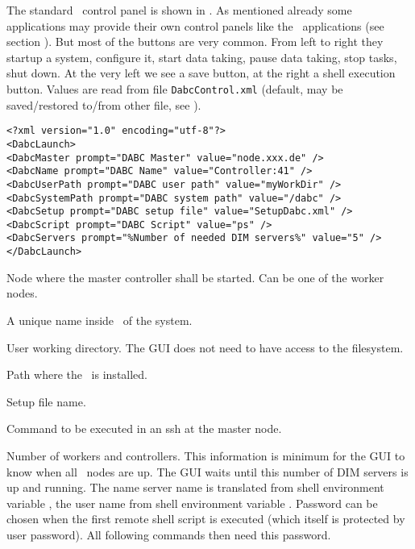 The standard \dabc\ control panel is shown in .
As mentioned already some applications may provide their own control panels
like the \mbs\ applications (see section ).
But most of the buttons are very common.
From left to right they startup a system, configure it, start
data taking, pause data taking, stop tasks, shut down.
At the very left we see a save button, at the right a shell execution button.
Values are read from file {\tt DabcControl.xml} (default, may be saved/restored to/from other file,
see ).
{\small \begin{verbatim}
<?xml version="1.0" encoding="utf-8"?>
<DabcLaunch>
<DabcMaster prompt="DABC Master" value="node.xxx.de" />
<DabcName prompt="DABC Name" value="Controller:41" />
<DabcUserPath prompt="DABC user path" value="myWorkDir" />
<DabcSystemPath prompt="DABC system path" value="/dabc" />
<DabcSetup prompt="DABC setup file" value="SetupDabc.xml" />
<DabcScript prompt="DABC Script" value="ps" />
<DabcServers prompt="%Number of needed DIM servers%" value="5" />
</DabcLaunch>
\end{verbatim}
\bdes
\item[DabcMaster:] Node where the master controller shall be started.
Can be one of the worker nodes.
\item[DabcName:] A unique name inside \dabc\ of the system.
\item[DabcUserPath:] User working directory. The GUI does not need to have
access to the filesystem. 
\item[DabcSystemPath:] Path where the \dabc\ is installed.
\item[DabcSetup:] Setup file name.
\item[DabcScript:] Command to be executed in an ssh at the master node.
\item[DabcServers:] Number of workers and controllers. This information
is minimum for the GUI to know when all \dabc\ nodes are up. The GUI waits until
this number of DIM servers is up and running.
\edes
The name server name is translated from shell environment variable ,
the user name from shell environment variable . Password can be chosen when
the first remote shell script is executed (which itself is protected by
user password). All following commands then need this password.

}
